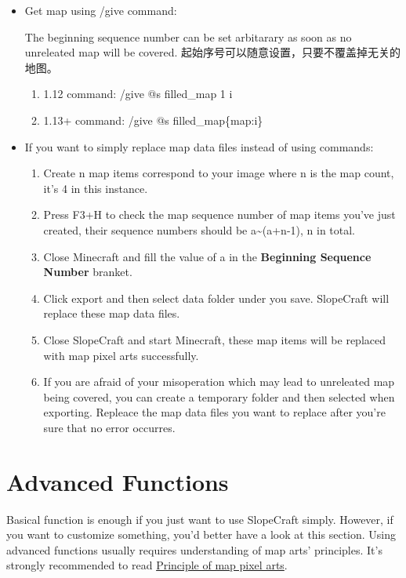 \documentclass{article}
\begin{document}
   \begin{itemize}
       \item Get map using /give command:
       
       The beginning sequence number can be set arbitarary as soon as no unreleated map will be covered.
       起始序号可以随意设置，只要不覆盖掉无关的地图。
       \begin{enumerate}
           \item 1.12 command: /give @s filled\_map 1 i
           \item 1.13+ command: /give @s filled\_map\{map:i\}
       \end{enumerate}
       \item If you want to simply replace map data files instead of using commands:
       \begin{enumerate}
           \item Create n map items correspond to your image where n is the map count, it's 4 in this instance.
           \item Press F3+H to check the map sequence number of map items you've just created, their sequence numbers should be a\textasciitilde(a+n-1), n in total.
           \item Close Minecraft and fill the value of a in the \textbf{Beginning Sequence Number} branket.
           \item Click export and then select data folder under you save. SlopeCraft will replace these map data files. 
           \item Close SlopeCraft and start Minecraft, these map items will be replaced with map pixel arts successfully.
           \item If you are afraid of your misoperation which may lead to unreleated map being covered, you can create a temporary folder and then selected when exporting. Repleace the map data files you want to replace after you're sure that no error occurres.
       \end{enumerate}
   \end{itemize}
   
   \pagebreak
   \section{Advanced Functions}
   Basical function is enough if you just want to use SlopeCraft simply. However, if you want to customize something, you'd better have a look at this section. Using advanced functions usually requires understanding of map arts' principles. It's strongly recommended to read \href{https://github.com/ToKiNoBug/SlopeCraftTutorial/blob/main/BasicPrinciple/Principle%20of%20map%20pixel%20arts.md}{Principle of map pixel arts}.
\end{document}
